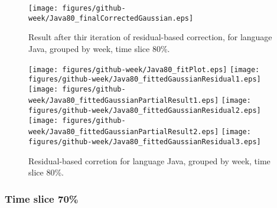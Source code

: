 \begin{figure}[]
\centering
{\texttt{[image: figures/github-week/Java80\_finalCorrectedGaussian.eps]}}
\caption{Result after thir iteration of residual-based correction, for language Java, grouped by week, time slice 80\%.}
\end{figure}


\begin{figure}[hb]
\centering
{}
{\texttt{[image: figures/github-week/Java80\_fitPlot.eps]}}
{\texttt{[image: figures/github-week/Java80\_fittedGaussianResidual1.eps]}}
{\texttt{[image: figures/github-week/Java80\_fittedGaussianPartialResult1.eps]}}
{\texttt{[image: figures/github-week/Java80\_fittedGaussianResidual2.eps]}}
{\texttt{[image: figures/github-week/Java80\_fittedGaussianPartialResult2.eps]}}
{\texttt{[image: figures/github-week/Java80\_fittedGaussianResidual3.eps]}}
\caption{Residual-based corretion for language Java, grouped by week, time slice 80\%.}
\end{figure}


\clearpage 
\newpage 


\FloatBarrier

\subsubsection{Time slice 70\%}


